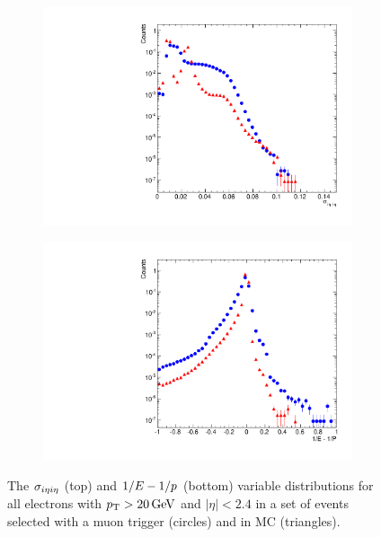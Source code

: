 \begin{figure}[!htbp]
    \centering
    \begin{subfigure}[b]{0.65\textwidth}
        \includegraphics[width=\textwidth]{figures/sigma_ieta_ieta.pdf}
        \caption{}
        \label{fig:sieie}
    \end{subfigure}
    \begin{subfigure}[b]{0.65\textwidth}
        \includegraphics[width=\textwidth]{figures/1oe_1op.pdf}
        \caption{}
        \label{fig:ooeoop}
    \end{subfigure}
    \caption{
        The $\sigma_{i \eta i \eta}$ (top) and $1/E - 1/p$ (bottom) variable
        distributions for all electrons with $p_{\mathrm{T}} > 20 \,\text{Ge\hspace{-.08em}V}$ and $|\eta| < 2.4$
        in a set of events selected with a muon trigger (circles) and in
        \MADGRAPH \Ztoee MC (triangles).
    }
    \label{fig:sieie_ooeoop}
\end{figure}

